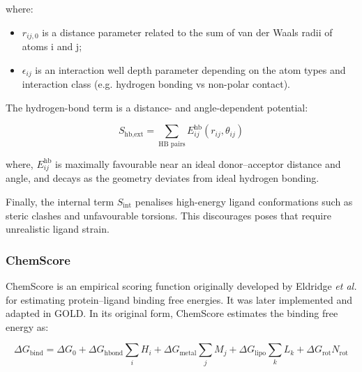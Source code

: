 \documentclass[12pt]{article}
\begin{document}
where:
\begin{itemize}
    \item $r_{ij,0}$ is a distance parameter related to the sum of van der Waals radii of atoms i and j;
    \item $\epsilon_{ij}$ is an interaction well depth parameter depending on the atom types and interaction class (e.g. hydrogen bonding vs non-polar contact).
\end{itemize}

The hydrogen-bond term is a distance- and angle-dependent potential:

\begin{equation}
S_{\textrm{hb,ext}}
=
\sum_{\textrm{HB\ pairs}}
E^{\textrm{hb}}_{ij}(r_{ij}, \theta_{ij})
\end{equation}

where,
$E^{\textrm{hb}}_{ij}$ is maximally favourable near an ideal donor–acceptor distance and angle, and decays as the geometry deviates from ideal hydrogen bonding.

Finally, the internal term $S_{\textrm{int}}$ penalises high-energy ligand conformations such as steric clashes and unfavourable torsions. This discourages poses that require unrealistic ligand strain.

\subsubsection{ChemScore}
ChemScore is an empirical scoring function originally developed by Eldridge \emph{et al.} for estimating protein–ligand binding free energies\cite{CH7_Eldridge1997}. It was later implemented and adapted in GOLD\cite{CH7_Verdonk2003}. In its original form, ChemScore estimates the binding free energy as:

\begin{equation}
\Delta G_{\textrm{bind}}
=
\Delta G_{0}
+
\Delta G_{\textrm{hbond}}
\sum_{i} H_{i}
+
\Delta G_{\textrm{metal}}
\sum_{j} M_{j}
+
\Delta G_{\textrm{lipo}}
\sum_{k} L_{k}
+
\Delta G_{\textrm{rot}} N_{\textrm{rot}}
\label{eq:ChemScore}
\end{equation}
\end{document}
